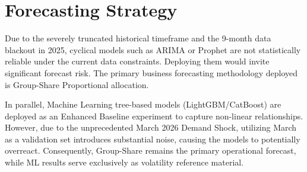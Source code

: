 \section{Forecasting Strategy}
Due to the severely truncated historical timeframe and the 9-month data blackout in 2025, cyclical models such as ARIMA or Prophet are not statistically reliable under the current data constraints. Deploying them would invite significant forecast risk. The primary business forecasting methodology deployed is Group-Share Proportional allocation.

In parallel, Machine Learning tree-based models (LightGBM/CatBoost) are deployed as an Enhanced Baseline experiment to capture non-linear relationships. However, due to the unprecedented March 2026 Demand Shock, utilizing March as a validation set introduces substantial noise, causing the models to potentially overreact. Consequently, Group-Share remains the primary operational forecast, while ML results serve exclusively as volatility reference material.
\FloatBarrier
